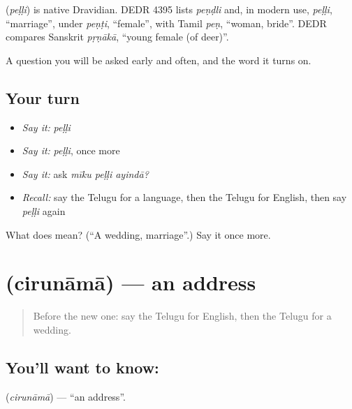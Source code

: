 \begin{cousinweb}
\textbf{} (\emph{peḷḷi}) is native Dravidian. DEDR 4395 lists \emph{peṇḍli} and, in modern use, \emph{peḷḷi}, \textquotedblleft{}marriage\textquotedblright{}, under \emph{peṇṭi}, \textquotedblleft{}female\textquotedblright{}, with Tamil \emph{peṇ}, \textquotedblleft{}woman, bride\textquotedblright{}. DEDR compares Sanskrit \emph{pṛṇākā}, \textquotedblleft{}young female (of deer)\textquotedblright{}.
\end{cousinweb}

\begin{grammarlens}[title={What you've built}]
A question you will be asked early and often, and the word it turns on.
\end{grammarlens}

\subsection*{Your turn}
\begin{itemize}
\raggedright
  \item \emph{Say it:} \emph{peḷḷi}
  \item \emph{Say it:} \emph{peḷḷi}, once more
  \item \emph{Say it:} ask \emph{mīku peḷḷi ayindā?}
  \item \emph{Recall:} say the Telugu for a language, then the Telugu for English, then say \emph{peḷḷi} again
\end{itemize}

\begin{tcolorbox}[breakable,colback=teal!4,colframe=teal!35!black,title={Before you move on}]
What does  mean? (\textquotedblleft{}A wedding, marriage\textquotedblright{}.) Say it once more.
\end{tcolorbox}
\section[\texorpdfstring{\te{చిరునామా} (cirunāmā)}{చిరునామా (cirunāmā)}]{ (cirunāmā) — an address}

\label{lesson:TE-C89-address}



\begin{quote}
Before the new one: say the Telugu for English, then the Telugu for a wedding.
\end{quote}

\subsection*{You'll want to know: }
\textbf{} (\emph{cirunāmā}) — \textquotedblleft{}an address\textquotedblright{}.

